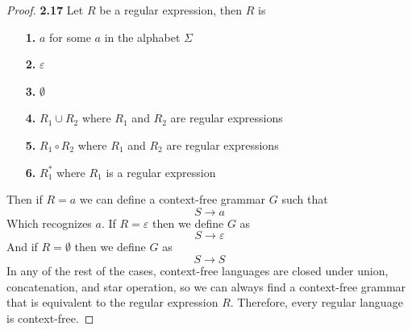 \documentclass[11pt]{article}
\theoremstyle{definition}
\begin{document}
\cleardoublepage
\begin{proof}{\textbf{2.17}}
Let $R$ be a regular expression, then $R$ is 
\begin{itemize}
    \item [\textbf{1.}] $a$ for some $a$ in the alphabet $\Sigma$
    \item [\textbf{2.}] $\varepsilon$
    \item [\textbf{3.}] $\emptyset$
    \item [\textbf{4.}] $R_1 \cup R_2$ where $R_1$ and $R_2$ are regular expressions
    \item [\textbf{5.}] $R_1 \circ R_2$ where $R_1$ and $R_2$ are regular expressions
    \item [\textbf{6.}] $R_1^*$ where $R_1$ is a regular expression
\end{itemize}
Then if $R = a$ we can define a context-free grammar $G$ such that
$$S \to a$$
Which recognizes $a$.
If $R = \varepsilon$ then we define $G$ as
$$S \to \varepsilon$$
And if $R = \emptyset$ then we define $G$ as
$$S \to S$$
In any of the rest of the cases, context-free languages are closed under union,
concatenation, and star operation, so we can always find a context-free grammar
that is equivalent to the regular expression $R$.
Therefore, every regular language is context-free.
\end{proof}
\end{document}
